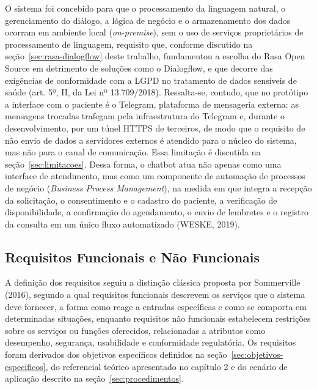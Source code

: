 \documentclass[12pt,a4paper]{extarticle}
\begin{document}
O sistema foi concebido para que o processamento da linguagem natural, o gerenciamento do diálogo, a lógica de negócio e o armazenamento dos dados ocorram em ambiente local (\textit{on-premise}), sem o uso de serviços proprietários de processamento de linguagem, requisito que, conforme discutido na seção~\ref{sec:rasa-dialogflow} deste trabalho, fundamentou a escolha do Rasa Open Source em detrimento de soluções como o Dialogflow, e que decorre das exigências de conformidade com a LGPD no tratamento de dados sensíveis de saúde (art. 5º, II, da Lei nº 13.709/2018). Ressalta-se, contudo, que no protótipo a interface com o paciente é o Telegram, plataforma de mensageria externa: as mensagens trocadas trafegam pela infraestrutura do Telegram e, durante o desenvolvimento, por um túnel HTTPS de terceiros, de modo que o requisito de não envio de dados a servidores externos é atendido para o núcleo do sistema, mas não para o canal de comunicação. Essa limitação é discutida na seção~\ref{sec:limitacoes}. Dessa forma, o chatbot atua não apenas como uma interface de atendimento, mas como um componente de automação de processos de negócio (\textit{Business Process Management}), na medida em que integra a recepção da solicitação, o consentimento e o cadastro do paciente, a verificação de disponibilidade, a confirmação do agendamento, o envio de lembretes e o registro da consulta em um único fluxo automatizado (WESKE, 2019).

\subsection{Requisitos Funcionais e Não Funcionais}
\label{sec:requisitos}

A definição dos requisitos seguiu a distinção clássica proposta por Sommerville (2016), segundo a qual requisitos funcionais descrevem os serviços que o sistema deve fornecer, a forma como reage a entradas específicas e como se comporta em determinadas situações, enquanto requisitos não funcionais estabelecem restrições sobre os serviços ou funções oferecidos, relacionadas a atributos como desempenho, segurança, usabilidade e conformidade regulatória. Os requisitos foram derivados dos objetivos específicos definidos na seção~\ref{sec:objetivos-especificos}, do referencial teórico apresentado no capítulo 2 e do cenário de aplicação descrito na seção~\ref{sec:procedimentos}.
\end{document}
